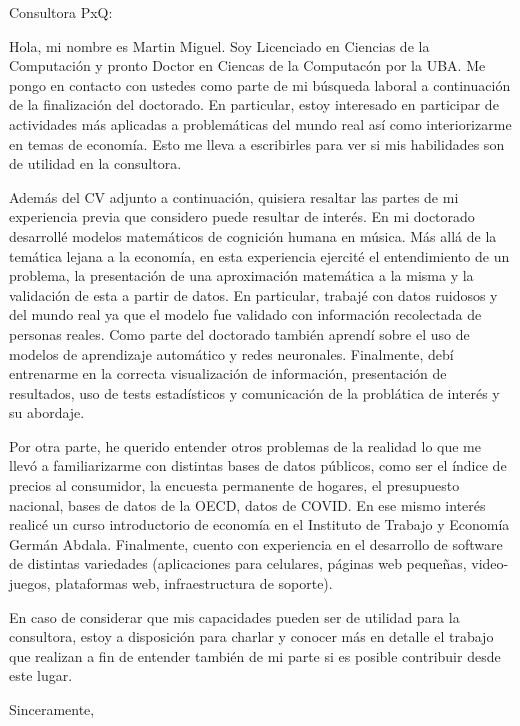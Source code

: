\documentclass[a4paper]{letter}
\begin{document}
\begin{letter}{}

  \opening{Consultora PxQ:}

  Hola, mi nombre es Martin Miguel. Soy Licenciado en Ciencias de la
  Computación y pronto Doctor en Ciencas de la Computacón por la UBA. Me pongo
  en contacto con ustedes como parte de mi búsqueda laboral a continuación de
  la finalización del doctorado. En particular, estoy interesado en participar
  de actividades más aplicadas a problemáticas del mundo real así como
  interiorizarme en temas de economía. Esto me lleva a escribirles para ver si
  mis habilidades son de utilidad en la consultora.

  Además del CV adjunto a continuación, quisiera resaltar las partes de mi
  experiencia previa que considero puede resultar de interés. 
  En mi doctorado desarrollé modelos matemáticos de cognición humana en música.
  Más allá de la temática lejana a la economía, en esta experiencia ejercité el
  entendimiento de un problema, la presentación de una aproximación matemática
  a la misma y la validación de esta a partir de datos. En particular, trabajé
  con datos ruidosos y del mundo real ya que el modelo fue validado con
  información recolectada de personas reales. Como parte del doctorado también
  aprendí sobre el uso de modelos de aprendizaje automático y redes neuronales.
  Finalmente, debí entrenarme en la correcta visualización de información,
  presentación de resultados, uso de tests estadísticos y comunicación de la
  problática de interés y su abordaje.
  
  Por otra parte, he querido entender otros problemas de la realidad lo que me
  llevó a familiarizarme con distintas bases de datos públicos, como ser el
  índice de precios al consumidor, la encuesta permanente de hogares, el
  presupuesto nacional, bases de datos de la OECD, datos de COVID. En ese mismo
  interés realicé un curso introductorio de economía en el Instituto de Trabajo
  y Economía Germán Abdala.
  Finalmente, cuento con experiencia en el desarrollo de
  software de distintas variedades (aplicaciones para celulares, páginas web
  pequeñas, video-juegos, plataformas web, infraestructura de soporte).


  En caso de considerar que mis capacidades pueden ser de utilidad para la
  consultora, estoy a disposición para charlar y conocer más en detalle el
  trabajo que realizan a fin de entender también de mi parte si es posible
  contribuir desde este lugar.

  \closing{Sinceramente,}

\end{letter}
\end{document}
